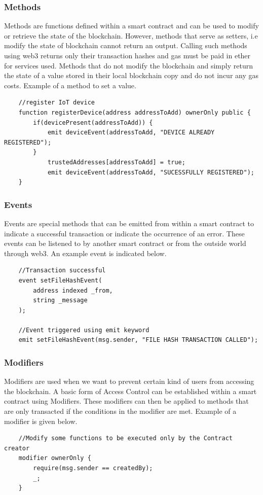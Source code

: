 \documentclass[11pt,openright]{report}
\begin{document}
\subsubsection{Methods}
Methods are functions defined within a smart contract and can be used to modify or retrieve the state of the blockchain. However, methods that serve as setters, i.e modify the state of blockchain cannot return an output. Calling such methods using web3 returns only their transaction hashes and gas must be paid in ether for services used. Methods that do not modify the blockchain and simply return the state of a value stored in their local blockchain copy and do not incur any gas costs. Example of a method to set a value.
\begin{verbatim}
    //register IoT device
    function registerDevice(address addressToAdd) ownerOnly public {
        if(devicePresent(addressToAdd)) {
            emit deviceEvent(addressToAdd, "DEVICE ALREADY REGISTERED");
        }
            trustedAddresses[addressToAdd] = true;
            emit deviceEvent(addressToAdd, "SUCESSFULLY REGISTERED");
    }
\end{verbatim}


\subsubsection{Events}
Events are special methods that can be emitted from within a smart contract to indicate a successful transaction or indicate the occurrence of an error. These events can be listened to by another smart contract or from the outside world through web3. An example event is indicated below.
\begin{verbatim}
    //Transaction successful
    event setFileHashEvent(
        address indexed _from,
        string _message
    );
    
    //Event triggered using emit keyword
    emit setFileHashEvent(msg.sender, "FILE HASH TRANSACTION CALLED");
\end{verbatim}


\subsubsection{Modifiers}
Modifiers are used when we want to prevent certain kind of users from accessing the blockchain. A basic form of Access Control can be established within a smart contract using Modifiers. These modifiers can then be applied to methods that are only transacted if the conditions in the modifier are met. Example of a modifier is given below.
\begin{verbatim}
    //Modify some functions to be executed only by the Contract creator
    modifier ownerOnly {
        require(msg.sender == createdBy);
        _;
    }
\end{verbatim}
\end{document}
